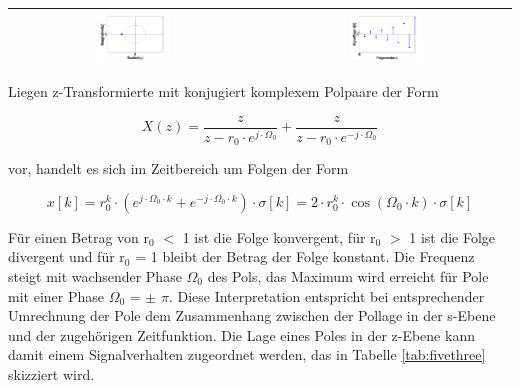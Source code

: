 \begin{table}[H]
{\begin{tabular}{| c | c |}
\parbox[c][1.4in][c]{3.3in}{\centerline{\includegraphics[width=0.3\textwidth]{Kapitel5/Table/image11.png}}} & 
\parbox[c][1.4in][c]{3.3in}{\centerline{\includegraphics[width=0.3\textwidth]{Kapitel5/Table/image12.png}}}\\ \hline


\end{tabular}%
}
\label{tab:fivetwo}
\end{table}

\clearpage

\noindent Liegen z-Transformierte mit konjugiert komplexem Polpaare der Form

\begin{equation}\label{eq:fivethirtyfive}
X\left(z\right)=\frac{z}{z-r_{0} \cdot e^{j\cdot \Omega _{0} } } +\frac{z}{z-r_{0} \cdot e^{-j\cdot \Omega _{0} } } 
\end{equation}

\noindent vor, handelt es sich im Zeitbereich um Folgen der Form

\begin{equation}\label{eq:fivethirtysix}
x\left[k\right]=r_{0}^{k} \cdot \left(e^{j\cdot \Omega _{0} \cdot k} +e^{-j\cdot \Omega _{0} \cdot k} \right)\cdot \sigma \left[k\right]=2\cdot r_{0}^{k} \cdot \cos \left(\Omega _{0} \cdot k\right)\cdot \sigma \left[k\right]
\end{equation}

\noindent F\"{u}r einen Betrag von {\textbar}r${}_{0}${\textbar} $\mathrm{<}$ 1 ist die Folge konvergent, f\"{u}r {\textbar}r${}_{0}${\textbar} $\mathrm{>}$ 1 ist die Folge divergent und f\"{u}r {\textbar}r${}_{0}${\textbar} = 1 bleibt der Betrag der Folge konstant. Die Frequenz steigt mit wachsender Phase $\Omega_{0}$ des Pols, das Maximum wird erreicht f\"{u}r Pole mit einer Phase $\Omega_{0}$ = $\mathrm{\pm}$ $\pi$. Diese Interpretation entspricht bei entsprechender Umrechnung der Pole dem Zusammenhang zwischen der Pollage in der s-Ebene und der zugeh\"{o}rigen Zeitfunktion. Die Lage eines Poles in der z-Ebene kann damit einem Signalverhalten zugeordnet werden, das in Tabelle \ref{tab:fivethree} skizziert wird.

